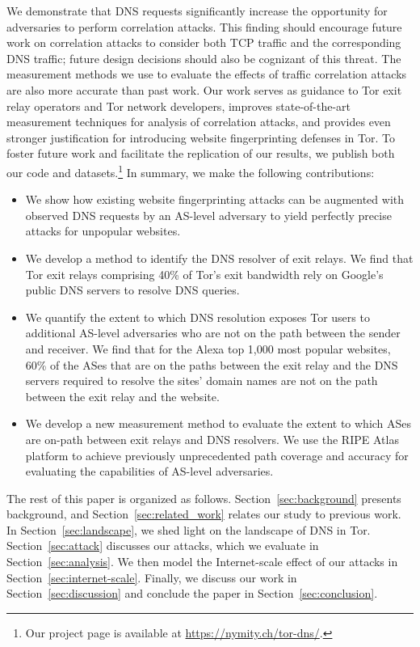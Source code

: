 We demonstrate that DNS requests significantly increase the opportunity
for adversaries to perform correlation attacks. This finding should
encourage future work on correlation attacks to consider both TCP
traffic and the corresponding DNS traffic; future design decisions
should also be cognizant of this threat.  The measurement methods we use
to evaluate the effects of traffic correlation attacks are also more
accurate than past work. Our work \first serves as guidance to Tor exit
relay operators and Tor network developers, \second improves
state-of-the-art measurement techniques for analysis of correlation attacks, and \third
provides even stronger justification for introducing website fingerprinting defenses in
Tor.  To foster future work and facilitate the replication of
our results, we publish both our code and datasets.\footnote{Our project page is
available at \url{https://nymity.ch/tor-dns/}.}
In summary, we make the following contributions:
\begin{itemize}

\item We show how existing website fingerprinting attacks can be
  augmented with observed DNS requests by an AS-level adversary to
  yield perfectly precise \name attacks for unpopular websites.

\item We develop a method to identify the DNS resolver of exit
  relays. We find that Tor exit relays comprising 40\% of Tor's exit
  bandwidth rely on Google's public DNS servers to resolve DNS queries.

\item We quantify the extent to which DNS resolution exposes Tor users
  to additional AS-level adversaries who are not on the path between the
  sender and receiver.  We find that for the Alexa top 1,000 most
  popular websites, 60\% of the ASes that are on the paths between the
  exit relay and the DNS servers required to resolve the sites' domain
  names are not on the path between the exit relay and the website.

\item We develop a new measurement method to evaluate the extent to
  which ASes are on-path between exit relays and DNS resolvers. We use
  the RIPE Atlas~\cite{atlas} platform to achieve previously
  unprecedented path coverage and accuracy for evaluating the
  capabilities of AS-level adversaries.
\end{itemize}
\noindent
The rest of this paper is organized as follows.
Section~\ref{sec:background} presents background, and
Section~\ref{sec:related_work} relates our study to previous work.  In
Section~\ref{sec:landscape}, we shed light on the landscape of DNS in
Tor.  Section~\ref{sec:attack} discusses our \name attacks, which we
evaluate in Section~\ref{sec:analysis}.  We then model the
Internet-scale effect of our attacks in
Section~\ref{sec:internet-scale}.  Finally, we discuss our work in
Section~\ref{sec:discussion} and conclude the paper in
Section~\ref{sec:conclusion}.
